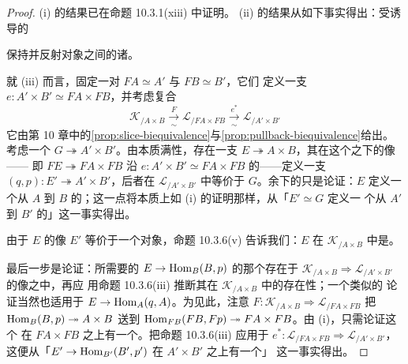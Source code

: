 \begin{proof}
(i) 的结果已在命题 10.3.1(xiii) 中证明。
(ii) 的结果从如下事实得出：受诱导的\trCosmologicalBiequivalence
\begin{center}
\end{center}
保持并反射对象之间的诸\trEquivalence。

就 (iii) 而言，固定一对\trEquivalence{} $FA\simeq A'$ 与 $FB\simeq B'$，它们
定义一支\trEquivalence{} $e\colon A'\times B'\simeq FA\times FB$，并考虑复合%
\trBiequivalence
\begin{equation*}
\mathcal{K}_{/A\times B}
\xrightarrow[\ \sim\ ]{\ F\ }
\mathcal{L}_{/FA\times FB}
\xrightarrow[\ \sim\ ]{\ e^{*}\ }
\mathcal{L}_{/A'\times B'}
\end{equation*}
它由第 10 章中的\cref{prop:slice-biequivalence}与\cref{prop:pullback-biequivalence}给出。考虑一个\trModule{}
$G\twoheadrightarrow A'\times B'$。由本质满性，存在一支\trIsofibration{}
$E\twoheadrightarrow A\times B$，其在这个\trCosmologicalFunctor{}之下的像——
即 $FE\twoheadrightarrow FA\times FB$ 沿
$e\colon A'\times B'\simeq FA\times FB$ 的\trPullback——定义一支%
\trIsofibration{} $(q,p)\colon E'\twoheadrightarrow A'\times B'$，后者在
$\mathcal{L}_{/A'\times B'}$ 中等价于 $G$。余下的只是论证：$E$ 定义一个从 $A$
到 $B$ 的\trModule；这一点将本质上如 (i) 的证明那样，从「$E'\simeq G$ 定义一
个从 $A'$ 到 $B'$ 的\trModule」这一事实得出。

由于 $E$ 的像 $E'$ 等价于一个\trDiscrete{}对象，命题 10.3.6(v) 告诉我们：$E$
在 $\mathcal{K}_{/A\times B}$ 中是\trDiscrete{}。

最后一步是论证：所需要的 $E\to\mathrm{Hom}_{B}(B,p)$ 的那个\trRightAdjoint{}存在于%
\trBiequivalence{}
$\mathcal{K}_{/A\times B}\Rightarrow\mathcal{L}_{/A'\times B'}$ 的像之中，再应
用命题 10.3.6(iii) 推断其在 $\mathcal{K}_{/A\times B}$ 中的存在性；一个类似的
论证当然也适用于\trFunctor{} $E\to\mathrm{Hom}_{A}(q,A)$。为见此，注意
$F\colon\mathcal{K}_{/A\times B}\Rightarrow\mathcal{L}_{/FA\times FB}$ 把
$\mathrm{Hom}_{B}(B,p)\twoheadrightarrow A\times B$ 送到
$\mathrm{Hom}_{FB}(FB,Fp)\twoheadrightarrow FA\times FB$。由 (i)，只需论证这个\trFunctor{}%
在 $FA\times FB$ 之上有一个\trRightAdjoint。把命题 10.3.6(iii) 应用于%
\trBiequivalence{}
$e^{*}\colon\mathcal{L}_{/FA\times FB}\Rightarrow\mathcal{L}_{/A'\times B'}$，
这便从「$E'\to\mathrm{Hom}_{B'}(B',p')$ 在 $A'\times B'$ 之上有一个\trRightAdjoint」
这一事实得出。
\end{proof}

